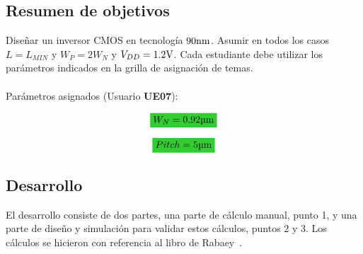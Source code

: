 
\subsection{Resumen de objetivos}


\normalfont

Diseñar un inversor CMOS en tecnología $90 \si[per-mode=symbol]{\nano\meter}$. Asumir en todos los casos $L = L_{MIN}$ y $W_{P} = 2W_{N}$ y $V_{DD} = 1.2 \si[per-mode=symbol]{\volt}$. Cada estudiante debe utilizar los parámetros indicados en la grilla de asignación de temas.
\\\\


Parámetros asignados (Usuario \textbf{UE07}):


\begin{equation*}
\mathcolorbox{EQColor}{ W_{N} = 0.92 \si[per-mode=symbol]{\micro\meter} }
\end{equation*}

\begin{equation*}
\mathcolorbox{EQColor}{ Pitch = 5 \si[per-mode=symbol]{\micro\meter} }
\end{equation*}


\subsection{Desarrollo}


El desarrollo consiste de dos partes, una parte de cálculo manual, punto \num{1}, y una parte de diseño y simulación para validar estos cálculos, puntos \num{2} y \num{3}. Los cálculos se hicieron con referencia al libro de Rabaey~\cite{Rabaey2}.




\clearpage
